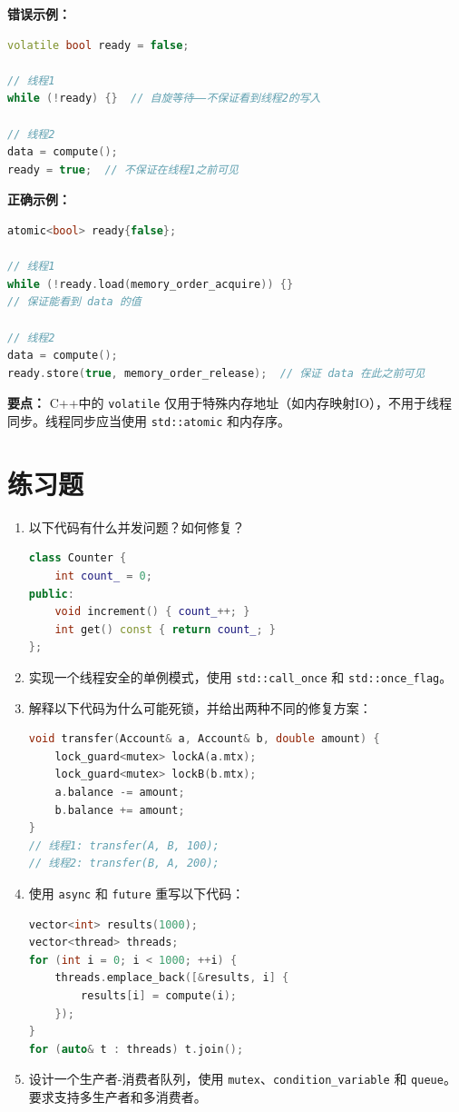 \textbf{错误示例：}

\begin{lstlisting}[language=C++]
volatile bool ready = false;

// 线程1
while (!ready) {}  // 自旋等待——不保证看到线程2的写入

// 线程2
data = compute();
ready = true;  // 不保证在线程1之前可见
\end{lstlisting}

\textbf{正确示例：}

\begin{lstlisting}[language=C++]
atomic<bool> ready{false};

// 线程1
while (!ready.load(memory_order_acquire)) {}
// 保证能看到 data 的值

// 线程2
data = compute();
ready.store(true, memory_order_release);  // 保证 data 在此之前可见
\end{lstlisting}

\textbf{要点：} C++中的 \texttt{volatile} 仅用于特殊内存地址（如内存映射IO），不用于线程同步。线程同步应当使用 \texttt{std::atomic} 和内存序。

\section*{练习题}

\begin{enumerate}
\item 以下代码有什么并发问题？如何修复？
\begin{lstlisting}[language=C++]
class Counter {
    int count_ = 0;
public:
    void increment() { count_++; }
    int get() const { return count_; }
};
\end{lstlisting}

\item 实现一个线程安全的单例模式，使用 \texttt{std::call\_once} 和 \texttt{std::once\_flag}。

\item 解释以下代码为什么可能死锁，并给出两种不同的修复方案：
\begin{lstlisting}[language=C++]
void transfer(Account& a, Account& b, double amount) {
    lock_guard<mutex> lockA(a.mtx);
    lock_guard<mutex> lockB(b.mtx);
    a.balance -= amount;
    b.balance += amount;
}
// 线程1: transfer(A, B, 100);
// 线程2: transfer(B, A, 200);
\end{lstlisting}

\item 使用 \texttt{async} 和 \texttt{future} 重写以下代码：
\begin{lstlisting}[language=C++]
vector<int> results(1000);
vector<thread> threads;
for (int i = 0; i < 1000; ++i) {
    threads.emplace_back([&results, i] {
        results[i] = compute(i);
    });
}
for (auto& t : threads) t.join();
\end{lstlisting}

\item 设计一个生产者-消费者队列，使用 \texttt{mutex}、\texttt{condition\_variable} 和 \texttt{queue}。要求支持多生产者和多消费者。
\end{enumerate}

